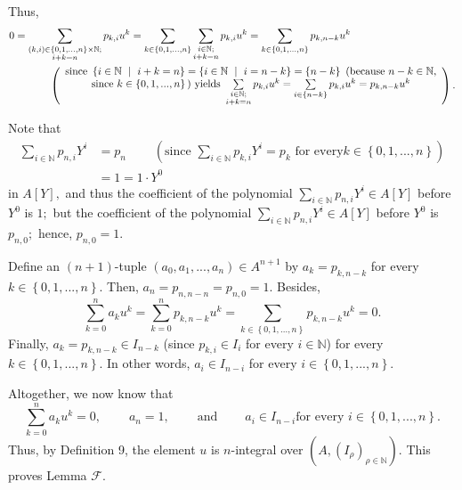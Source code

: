 \documentclass[12pt,final,notitlepage,onecolumn]{article}%
\begin{document}
Thus,%
\begin{align*}
0  &  =\sum\limits_{\substack{\left(  k,i\right)  \in\left\{
0,1,...,n\right\}  \times\mathbb{N};\\i+k=n}}p_{k,i}u^{k}=\sum\limits_{k\in
\left\{  0,1,...,n\right\}  }\sum_{\substack{i\in\mathbb{N};\\i+k=n}%
}p_{k,i}u^{k}=\sum\limits_{k\in\left\{  0,1,...,n\right\}  }p_{k,n-k}u^{k}\\
&  \ \ \ \ \ \ \ \ \ \ \left(
\begin{array}
[c]{c}%
\text{since }\left\{  i\in\mathbb{N}\text{\ }\mid\ i+k=n\right\}  =\left\{
i\in\mathbb{N}\ \mid\ i=n-k\right\}  =\left\{  n-k\right\}  \text{ (because
}n-k\in\mathbb{N}\text{,}\\
\text{since }k\in\left\{  0,1,...,n\right\}  \text{) yields }\sum
\limits_{\substack{i\in\mathbb{N};\\i+k=n}}p_{k,i}u^{k}=\sum\limits_{i\in
\left\{  n-k\right\}  }p_{k,i}u^{k}=p_{k,n-k}u^{k}%
\end{array}
\right)  .
\end{align*}


Note that%
\begin{align*}
\sum\limits_{i\in\mathbb{N}}p_{n,i}Y^{i}  &  =p_{n}\ \ \ \ \ \ \ \ \ \ \left(
\text{since }\sum\limits_{i\in\mathbb{N}}p_{k,i}Y^{i}=p_{k}\text{ for every
}k\in\left\{  0,1,...,n\right\}  \right) \\
&  =1=1\cdot Y^{0}%
\end{align*}
in $A\left[  Y\right]  ,$ and thus the coefficient of the polynomial
$\sum\limits_{i\in\mathbb{N}}p_{n,i}Y^{i}\in A\left[  Y\right]  $ before
$Y^{0}$ is $1;$ but the coefficient of the polynomial $\sum\limits_{i\in
\mathbb{N}}p_{n,i}Y^{i}\in A\left[  Y\right]  $ before $Y^{0}$ is $p_{n,0};$
hence, $p_{n,0}=1$.

Define an $\left(  n+1\right)  $-tuple $\left(  a_{0},a_{1},...,a_{n}\right)
\in A^{n+1}$ by $a_{k}=p_{k,n-k}$ for every $k\in\left\{  0,1,...,n\right\}
.$ Then, $a_{n}=p_{n,n-n}=p_{n,0}=1$. Besides,%
\[
\sum\limits_{k=0}^{n}a_{k}u^{k}=\sum\limits_{k=0}^{n}p_{k,n-k}u^{k}%
=\sum\limits_{k\in\left\{  0,1,...,n\right\}  }p_{k,n-k}u^{k}=0.
\]
Finally, $a_{k}=p_{k,n-k}\in I_{n-k}$ (since $p_{k,i}\in I_{i}$ for every
$i\in\mathbb{N}$) for every $k\in\left\{  0,1,...,n\right\}  $. In other
words, $a_{i}\in I_{n-i}$ for every $i\in\left\{  0,1,...,n\right\}  $.

Altogether, we now know that%
\[
\sum\limits_{k=0}^{n}a_{k}u^{k}=0,\ \ \ \ \ \ \ \ \ \ a_{n}%
=1,\ \ \ \ \ \ \ \ \ \ \text{and}\ \ \ \ \ \ \ \ \ \ a_{i}\in I_{n-i}\text{
for every }i\in\left\{  0,1,...,n\right\}  .
\]
Thus, by Definition 9, the element $u$ is $n$-integral over $\left(  A,\left(
I_{\rho}\right)  _{\rho\in\mathbb{N}}\right)  $. This proves Lemma
$\mathcal{F}$.
\end{document}
